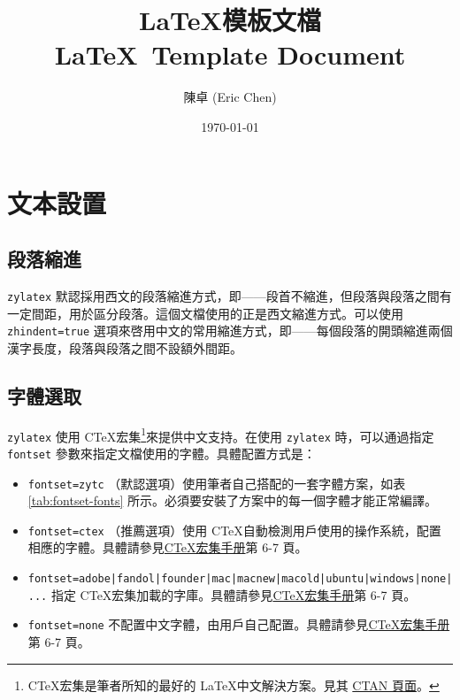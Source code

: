 \documentclass[
a4paper,
oneside,
12pt,
]{book}
\title{
  \Huge \LaTeX 模板文檔 \\
  \Large \LaTeX\ Template Document
}
\author{
  陳卓 (Eric Chen)
}
\date{\today}
\begin{document}
\maketitle

\tableofcontents

\chapter{文本設置}

\section{段落縮進}

\texttt{zylatex} 默認採用西文的段落縮進方式，即——段首不縮進，但段落與段落之間有一定間距，用於區分段落。這個文檔使用的正是西文縮進方式。可以使用 \texttt{zhindent=true} 選項來啓用中文的常用縮進方式，即——每個段落的開頭縮進兩個漢字長度，段落與段落之間不設額外間距。

\section{字體選取}

\texttt{zylatex} 使用 C\TeX 宏集\footnote{C\TeX 宏集是筆者所知的最好的 \LaTeX 中文解決方案。見其 \href{https://ctan.org/pkg/ctex}{CTAN 頁面}。}來提供中文支持。在使用 \texttt{zylatex} 時，可以通過指定 \texttt{fontset} 參數來指定文檔使用的字體。具體配置方式是：

\begin{itemize}
\item \texttt{fontset=zytc} （默認選項）使用筆者自己搭配的一套字體方案，如表 \ref{tab:fontset-fonts} 所示。必須要安裝了方案中的每一個字體才能正常編譯。
\item \texttt{fontset=ctex} （推薦選項）使用 C\TeX 自動檢測用戶使用的操作系統，配置相應的字體。具體請參見\href{http://mirrors.ctan.org/language/chinese/ctex/ctex.pdf}{C\TeX 宏集手册}第 6-7 頁。
\item \texttt{fontset=adobe|fandol|founder|mac|macnew|macold|ubuntu|windows|none|...} 指定 C\TeX 宏集加載的字庫。具體請參見\href{http://mirrors.ctan.org/language/chinese/ctex/ctex.pdf}{C\TeX 宏集手册}第 6-7 頁。
\item \texttt{fontset=none} 不配置中文字體，由用戶自己配置。具體請參見\href{http://mirrors.ctan.org/language/chinese/ctex/ctex.pdf}{C\TeX 宏集手册}第 6-7 頁。
\end{itemize}
\end{document}
